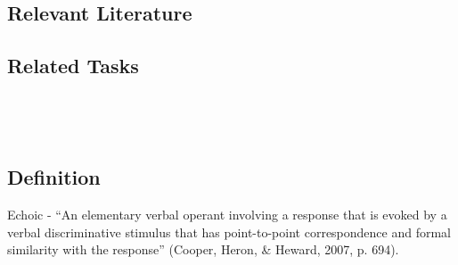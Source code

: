\subsection{Relevant Literature}
\begin{refsection}
\nocite{test,alang2017police,clayton2018black}
\printbibliography[heading=none]
\end{refsection}
%
\subsection{Related Tasks}
\foureFour{}\\
\fourFKFourtyOne{}\\
%
%
%
%
%
%
\section{\fourFKFourtyThree{}}
\subsection{Definition}  
Echoic - ``An elementary verbal operant involving a response that is evoked by a verbal discriminative stimulus that has point-to-point correspondence and formal similarity with the response'' (Cooper, Heron, \& Heward, 2007, p. 694).   
%
